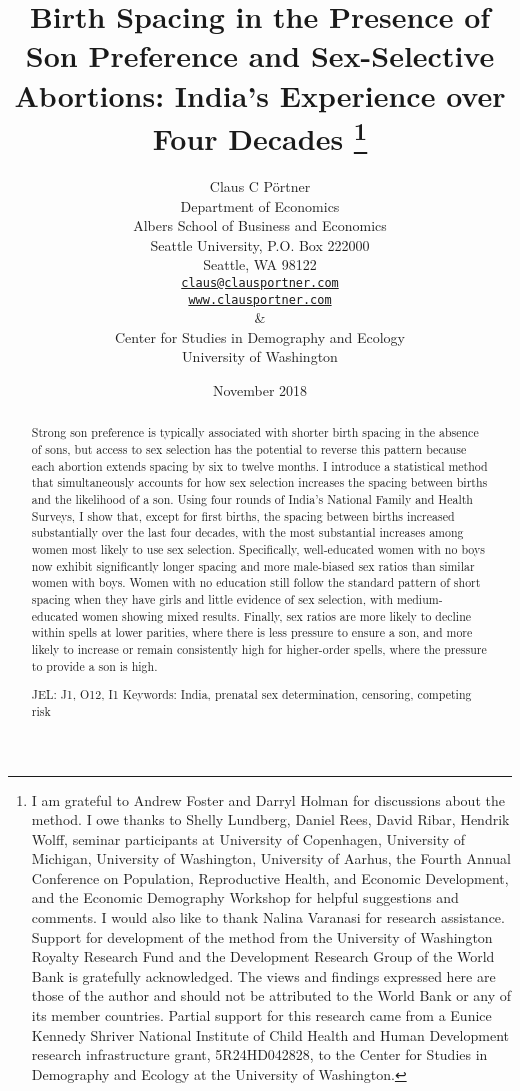 \documentclass[12pt,letterpaper]{article}
\title{Birth Spacing in the Presence of Son Preference and Sex-Selective Abortions:
India's Experience over Four Decades%
\protect\thanks{%
I am grateful to Andrew Foster and Darryl Holman for discussions about the method.
I owe thanks to Shelly Lundberg, Daniel Rees, David Ribar, 
Hendrik Wolff, seminar participants at University of Copenhagen, University of Michigan, 
University of Washington, University of Aarhus, the Fourth 
Annual Conference on Population, Reproductive Health, 
and Economic Development, and the Economic Demography Workshop for helpful 
suggestions and comments.
I would also like to thank Nalina Varanasi for research assistance.
Support for development of the method from the University of Washington Royalty 
Research Fund and the Development Research Group of the World Bank is gratefully 
acknowledged.
The views and findings expressed here are those of the author and
should not be attributed to the World Bank or any of its member countries.
Partial support for this research came from a Eunice Kennedy Shriver National
Institute of Child Health and Human Development research infrastructure grant,
5R24HD042828, to the Center for Studies in Demography and Ecology at the
University of Washington.
}
}
\author{Claus C P\"ortner\\
    Department of Economics\\
    Albers School of Business and Economics\\
    Seattle University, P.O. Box 222000\\
    Seattle, WA 98122\\
    \href{mailto:claus@clausportner.com}{\texttt{claus@clausportner.com}}\\
    \href{http://www.clausportner.com}{\texttt{www.clausportner.com}}\\
    \& \\
    Center for Studies in Demography and Ecology \\
    University of Washington\\ \vspace{2cm}
    }
\date{November 2018}
\begin{document}
\graphicspath{{../figures/}}

\setcounter{page}{-1}
\maketitle
\thispagestyle{empty}



\newpage
\thispagestyle{empty}
\doublespacing

\begin{abstract}

\noindent 

Strong son preference is typically associated with shorter birth spacing
in the absence of sons, but access to sex selection has the potential to
reverse this pattern because each abortion extends spacing by six to
twelve months. 
I introduce a statistical method that simultaneously
accounts for how sex selection increases the spacing between 
births and the likelihood of a son. 
Using four rounds of India's National
Family and Health Surveys, I show that, except for first births,
the spacing between births increased substantially over the last four
decades, with the most substantial increases among women most 
likely to use sex selection.
Specifically, well-educated women with no boys now
exhibit significantly longer spacing and more male-biased sex ratios
than similar women with boys. 
Women with no education still follow the standard
pattern of short spacing when they have girls and little evidence of sex
selection, with medium-educated women showing mixed results. 
Finally,
sex ratios are more likely to decline within spells at lower parities,
where there is less pressure to ensure a son, and more likely to
increase or remain consistently high for higher-order spells, where the
pressure to provide a son is high.


\noindent JEL: J1, O12, I1
\noindent Keywords: India, prenatal sex determination, censoring, competing risk
\end{abstract}

\newpage









\end{document}
